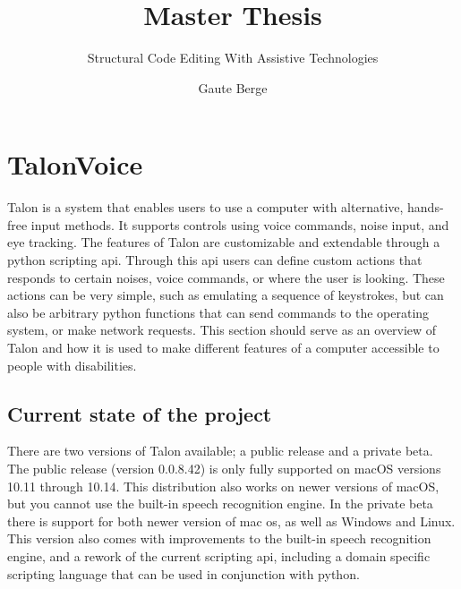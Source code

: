 \documentclass[a4paper,english]{ifimaster}
\title{Master Thesis}
\subtitle{Structural Code Editing With Assistive Technologies}
\author{Gaute Berge}
\begin{document}

\frontmatter{}



\mainmatter{}

\section{TalonVoice}
Talon is a system that enables users to use a computer with alternative, hands-free input methods.
It supports controls using voice commands, noise input, and eye tracking.
The features of Talon are customizable and extendable through a python scripting api.
Through this api users can define custom actions that responds to certain noises, voice commands, or where the user is looking.
These actions can be very simple, such as emulating a sequence of keystrokes, but can also be arbitrary python functions
that can send commands to the operating system, or make network requests.
This section should serve as an overview of Talon and how it is used to make different features of a computer accessible to people with disabilities.

\subsection{Current state of the project}
There are two versions of Talon available; a public release and a private beta.
The public release (version 0.0.8.42) is only fully supported on macOS versions 10.11 through 10.14.
This distribution also works on newer versions of macOS, but you cannot use the built-in speech recognition engine.
In the private beta there is support for both newer version of mac os, as well as Windows and Linux.
This version also comes with improvements to the built-in speech recognition engine, and a rework of the current scripting api, including a domain specific scripting language that can be used in conjunction with python.
\end{document}
